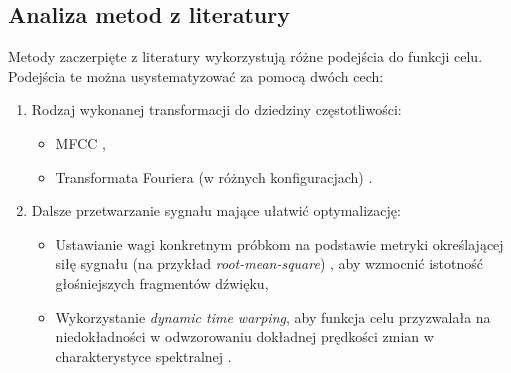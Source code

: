 \subsection{Analiza metod z literatury}

Metody zaczerpięte z literatury wykorzystują różne podejścia do funkcji celu.
Podejścia te można usystematyzować za pomocą dwóch cech:

\begin{enumerate}
  \item Rodzaj wykonanej transformacji do dziedziny częstotliwości:
  \begin{itemize}
    \item MFCC \cite{ieee_synth_programming} \cite{evolutionary_puredata} \cite{mfcc_dtw},
    \item Transformata Fouriera (w różnych konfiguracjach) \cite{riffusion} \cite{ddx7}.
  \end{itemize}
  \item Dalsze przetwarzanie sygnału mające ułatwić optymalizację:
    \begin{itemize}
      \item Ustawianie wagi konkretnym próbkom na podstawie metryki określającej siłę sygnału
        (na przykład \textit{root-mean-square})
        \cite{parallel_evolutionary_optimization_synth_parameters},
        aby wzmocnić istotność głośniejszych fragmentów dźwięku,
      \item Wykorzystanie \textit{dynamic time warping}, aby funkcja celu przyzwalała na
        niedokładności w odwzorowaniu dokładnej prędkości zmian w charakterystyce spektralnej \cite{mfcc_dtw}.
    \end{itemize}
\end{enumerate}



